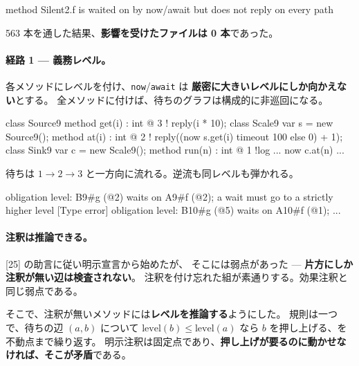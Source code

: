 \documentclass[11pt,a4paper]{ltjsarticle}
\theoremstyle{definition}
\theoremstyle{remark}
\begin{document}
\begin{term}
 method Silent2.f is waited on by now/await
             but does not reply on every path
\end{term}

563 本を通した結果、\textbf{影響を受けたファイルは 0 本}であった。

\paragraph{経路 1 --- 義務レベル。}
各メソッドにレベルを付け、\texttt{now}/\texttt{await} は
\textbf{厳密に大きいレベルにしか向かえない}とする。
全メソッドに付けば、待ちのグラフは構成的に非巡回になる。

\begin{aipl}
class Source9 { method get(i) : int @ 3 !{} { reply(i * 10); } }
class Scale9  {
  var s = new Source9();
  method at(i) : int @ 2 !{} { reply((now s.get(i) timeout 100 else 0) + 1); }
}
class Sink9 {
  var c = new Scale9();
  method run(n) : int @ 1 !{log} { ... now c.at(n) ... }
}
\end{aipl}

待ちは $1 \to 2 \to 3$ と一方向に流れる。逆流も同レベルも弾かれる。

\begin{term}
 obligation level: B9#g (@2) waits on A9#f (@2);
             a wait must go to a strictly higher level
[Type error] obligation level: B10#g (@5) waits on A10#f (@1); ...
\end{term}

\paragraph{注釈は推論できる。}
[25] の助言に従い明示宣言から始めたが、
そこには弱点があった --- \textbf{片方にしか注釈が無い辺は検査されない}。
注釈を付け忘れた組が素通りする。効果注釈と同じ弱点である。

そこで、注釈が無いメソッドには\textbf{レベルを推論する}ようにした。
規則は一つで、待ちの辺 $(a, b)$ について
$\mathrm{level}(b) \le \mathrm{level}(a)$ なら $b$ を押し上げる、を不動点まで繰り返す。
明示注釈は固定点であり、\textbf{押し上げが要るのに動かせなければ、そこが矛盾}である。

\end{document}
